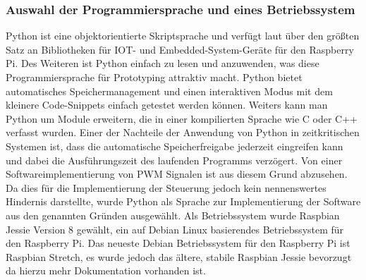\documentclass[BMR,Bachelor,ngerman]{twbook}%
\begin{document}
\subsubsection{Auswahl der Programmiersprache und eines Betriebssystem}
Python ist eine objektorientierte Skriptsprache und verfügt laut  über den größten Satz an Bibliotheken für \ac{IOT}- und Embedded-System-Geräte für den Raspberry Pi. Des Weiteren ist Python einfach zu lesen und anzuwenden, was diese Programmiersprache für Prototyping attraktiv macht. Python bietet automatisches Speichermanagement und einen interaktiven Modus mit dem kleinere Code-Snippets einfach getestet werden können. Weiters kann man Python um Module erweitern, die in einer kompilierten Sprache wie C oder C++ verfasst wurden. Einer der Nachteile der Anwendung von Python in zeitkritischen Systemen ist, dass die automatische Speicherfreigabe jederzeit eingreifen kann und dabei die Ausführungszeit des laufenden Programms verzögert. Von einer Softwareimplementierung von \ac{PWM} Signalen ist aus diesem Grund abzusehen. Da dies für die Implementierung der Steuerung jedoch kein nennenswertes Hindernis darstellte, wurde Python als Sprache zur Implementierung der Software aus den genannten Gründen ausgewählt. Als Betriebssystem wurde Raspbian Jessie Version 8 gewählt, ein auf Debian Linux basierendes Betriebssystem für den Raspberry Pi. Das neueste Debian Betriebssystem für den Raspberry Pi ist Raspbian Stretch, es wurde jedoch das ältere, stabile Raspbian Jessie bevorzugt da hierzu mehr Dokumentation vorhanden ist.%
\end{document}
